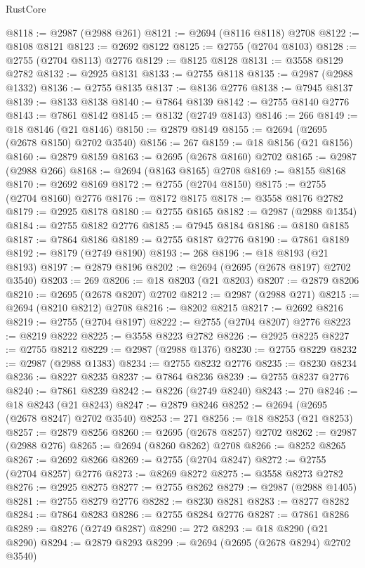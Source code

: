\begin{lexlean}{RustCore}
\begin{coremodule}
@8118 := @2987 (@2988 @261)
@8121 := @2694 (@8116 @8118) @2708
@8122 := @8108 @8121
@8123 := @2692 @8122
@8125 := @2755 (@2704 @8103)
@8128 := @2755 (@2704 @8113) @2776
@8129 := @8125 @8128
@8131 := @3558 @8129 @2782
@8132 := @2925 @8131
@8133 := @2755 @8118
@8135 := @2987 (@2988 @1332)
@8136 := @2755 @8135
@8137 := @8136 @2776
@8138 := @7945 @8137
@8139 := @8133 @8138
@8140 := @7864 @8139
@8142 := @2755 @8140 @2776
@8143 := @7861 @8142
@8145 := @8132 (@2749 @8143)
@8146 := 266
@8149 := @18 @8146 (@21 @8146)
@8150 := @2879 @8149
@8155 := @2694 (@2695 (@2678 @8150) @2702 @3540)
@8156 := 267
@8159 := @18 @8156 (@21 @8156)
@8160 := @2879 @8159
@8163 := @2695 (@2678 @8160) @2702
@8165 := @2987 (@2988 @266)
@8168 := @2694 (@8163 @8165) @2708
@8169 := @8155 @8168
@8170 := @2692 @8169
@8172 := @2755 (@2704 @8150)
@8175 := @2755 (@2704 @8160) @2776
@8176 := @8172 @8175
@8178 := @3558 @8176 @2782
@8179 := @2925 @8178
@8180 := @2755 @8165
@8182 := @2987 (@2988 @1354)
@8184 := @2755 @8182 @2776
@8185 := @7945 @8184
@8186 := @8180 @8185
@8187 := @7864 @8186
@8189 := @2755 @8187 @2776
@8190 := @7861 @8189
@8192 := @8179 (@2749 @8190)
@8193 := 268
@8196 := @18 @8193 (@21 @8193)
@8197 := @2879 @8196
@8202 := @2694 (@2695 (@2678 @8197) @2702 @3540)
@8203 := 269
@8206 := @18 @8203 (@21 @8203)
@8207 := @2879 @8206
@8210 := @2695 (@2678 @8207) @2702
@8212 := @2987 (@2988 @271)
@8215 := @2694 (@8210 @8212) @2708
@8216 := @8202 @8215
@8217 := @2692 @8216
@8219 := @2755 (@2704 @8197)
@8222 := @2755 (@2704 @8207) @2776
@8223 := @8219 @8222
@8225 := @3558 @8223 @2782
@8226 := @2925 @8225
@8227 := @2755 @8212
@8229 := @2987 (@2988 @1376)
@8230 := @2755 @8229
@8232 := @2987 (@2988 @1383)
@8234 := @2755 @8232 @2776
@8235 := @8230 @8234
@8236 := @8227 @8235
@8237 := @7864 @8236
@8239 := @2755 @8237 @2776
@8240 := @7861 @8239
@8242 := @8226 (@2749 @8240)
@8243 := 270
@8246 := @18 @8243 (@21 @8243)
@8247 := @2879 @8246
@8252 := @2694 (@2695 (@2678 @8247) @2702 @3540)
@8253 := 271
@8256 := @18 @8253 (@21 @8253)
@8257 := @2879 @8256
@8260 := @2695 (@2678 @8257) @2702
@8262 := @2987 (@2988 @276)
@8265 := @2694 (@8260 @8262) @2708
@8266 := @8252 @8265
@8267 := @2692 @8266
@8269 := @2755 (@2704 @8247)
@8272 := @2755 (@2704 @8257) @2776
@8273 := @8269 @8272
@8275 := @3558 @8273 @2782
@8276 := @2925 @8275
@8277 := @2755 @8262
@8279 := @2987 (@2988 @1405)
@8281 := @2755 @8279 @2776
@8282 := @8230 @8281
@8283 := @8277 @8282
@8284 := @7864 @8283
@8286 := @2755 @8284 @2776
@8287 := @7861 @8286
@8289 := @8276 (@2749 @8287)
@8290 := 272
@8293 := @18 @8290 (@21 @8290)
@8294 := @2879 @8293
@8299 := @2694 (@2695 (@2678 @8294) @2702 @3540)

\end{coremodule}
\end{lexlean}
